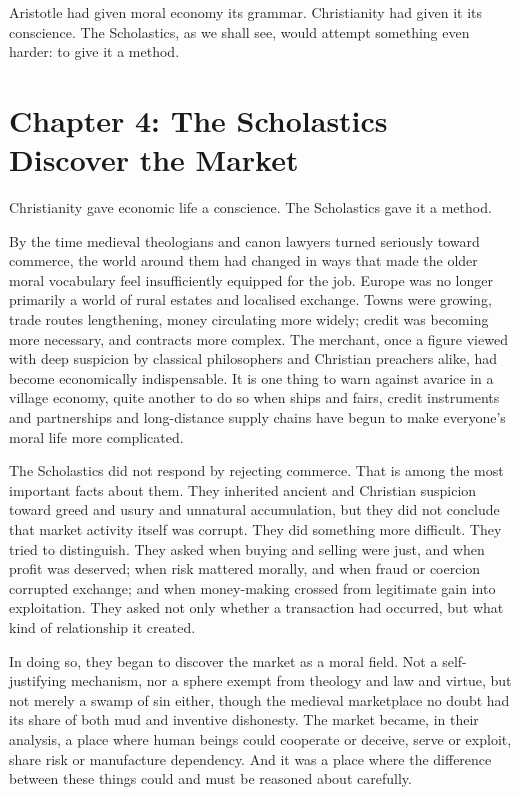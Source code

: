 \documentclass[11pt,a4paper,oneside]{book}
\begin{document}
Aristotle had given moral economy its grammar. Christianity had given it its conscience. The Scholastics, as we shall see, would attempt something even harder: to give it a method.

\chapter*{Chapter 4: The Scholastics Discover the Market}

Christianity gave economic life a conscience. The Scholastics gave it a method.

By the time medieval theologians and canon lawyers turned seriously toward commerce, the world around them had changed in ways that made the older moral vocabulary feel insufficiently equipped for the job. Europe was no longer primarily a world of rural estates and localised exchange. Towns were growing, trade routes lengthening, money circulating more widely; credit was becoming more necessary, and contracts more complex. The merchant, once a figure viewed with deep suspicion by classical philosophers and Christian preachers alike, had become economically indispensable. It is one thing to warn against avarice in a village economy, quite another to do so when ships and fairs, credit instruments and partnerships and long-distance supply chains have begun to make everyone's moral life more complicated.

The Scholastics did not respond by rejecting commerce. That is among the most important facts about them. They inherited ancient and Christian suspicion toward greed and usury and unnatural accumulation, but they did not conclude that market activity itself was corrupt. They did something more difficult. They tried to distinguish. They asked when buying and selling were just, and when profit was deserved; when risk mattered morally, and when fraud or coercion corrupted exchange; and when money-making crossed from legitimate gain into exploitation. They asked not only whether a transaction had occurred, but what kind of relationship it created.

In doing so, they began to discover the market as a moral field. Not a self-justifying mechanism, nor a sphere exempt from theology and law and virtue, but not merely a swamp of sin either, though the medieval marketplace no doubt had its share of both mud and inventive dishonesty. The market became, in their analysis, a place where human beings could cooperate or deceive, serve or exploit, share risk or manufacture dependency. And it was a place where the difference between these things could and must be reasoned about carefully.
\end{document}
